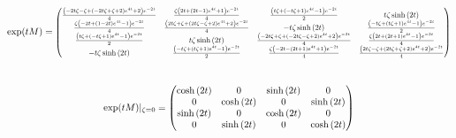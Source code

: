 \documentclass[10pt,a4paper]{article}
\newcommand{\mat}[1]{
    \begin{pmatrix}
        #1
    \end{pmatrix}
}
\begin{document}
\begin{gather*}
    \exp(tM) = \scalebox{0.8}{$\mat{\frac{\left(- 2 t \zeta - \zeta + \left(- 2 t \zeta + \zeta + 2\right) e^{4 t} + 2\right) e^{- 2 t}}{4} & \frac{\zeta \left(2 t + \left(2 t - 1\right) e^{4 t} + 1\right) e^{- 2 t}}{4} & \frac{\left(t \zeta + \left(- t \zeta + 1\right) e^{4 t} - 1\right) e^{- 2 t}}{2} & t \zeta \sinh{\left(2 t \right)}\\\frac{\zeta \left(- 2 t + \left(1 - 2 t\right) e^{4 t} - 1\right) e^{- 2 t}}{4} & \frac{\left(2 t \zeta + \zeta + \left(2 t \zeta - \zeta + 2\right) e^{4 t} + 2\right) e^{- 2 t}}{4} & - t \zeta \sinh{\left(2 t \right)} & \frac{\left(- t \zeta + \left(t \zeta + 1\right) e^{4 t} - 1\right) e^{- 2 t}}{2}\\\frac{\left(t \zeta + \left(- t \zeta + 1\right) e^{4 t} - 1\right) e^{- 2 t}}{2} & t \zeta \sinh{\left(2 t \right)} & \frac{\left(- 2 t \zeta + \zeta + \left(- 2 t \zeta - \zeta + 2\right) e^{4 t} + 2\right) e^{- 2 t}}{4} & \frac{\zeta \left(2 t + \left(2 t + 1\right) e^{4 t} - 1\right) e^{- 2 t}}{4}\\- t \zeta \sinh{\left(2 t \right)} & \frac{\left(- t \zeta + \left(t \zeta + 1\right) e^{4 t} - 1\right) e^{- 2 t}}{2} & \frac{\zeta \left(- 2 t - \left(2 t + 1\right) e^{4 t} + 1\right) e^{- 2 t}}{4} & \frac{\left(2 t \zeta - \zeta + \left(2 t \zeta + \zeta + 2\right) e^{4 t} + 2\right) e^{- 2 t}}{4}}$}
    \\[25pt]
    \exp(tM) |_{\zeta=0} = \mat{\cosh{\left(2 t \right)} & 0 & \sinh{\left(2 t \right)} & 0\\0 & \cosh{\left(2 t \right)} & 0 & \sinh{\left(2 t \right)}\\\sinh{\left(2 t \right)} & 0 & \cosh{\left(2 t \right)} & 0\\0 & \sinh{\left(2 t \right)} & 0 & \cosh{\left(2 t \right)}}
\end{gather*}
\end{document}
